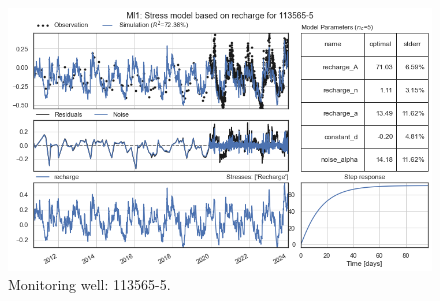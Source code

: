 \begin{figure}[htbp]
\begin{minipage}{0.32\textwidth}
        \centering
        \includegraphics[width=\linewidth]{frontmatter/Rozenburg-fig/15.png}
        \caption{Monitoring well: 113565-5.}
        \label{fig:112565-3}
    \end{minipage}
\end{figure}
